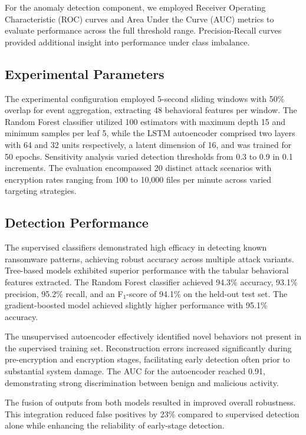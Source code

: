 For the anomaly detection component, we employed Receiver Operating Characteristic (ROC) curves and Area Under the Curve (AUC) metrics to evaluate performance across the full threshold range. Precision-Recall curves provided additional insight into performance under class imbalance.

\subsection{Experimental Parameters}

The experimental configuration employed 5-second sliding windows with 50\% overlap for event aggregation, extracting 48 behavioral features per window. The Random Forest classifier utilized 100 estimators with maximum depth 15 and minimum samples per leaf 5, while the LSTM autoencoder comprised two layers with 64 and 32 units respectively, a latent dimension of 16, and was trained for 50 epochs. Sensitivity analysis varied detection thresholds from 0.3 to 0.9 in 0.1 increments. The evaluation encompassed 20 distinct attack scenarios with encryption rates ranging from 100 to 10,000 files per minute across varied targeting strategies.

\subsection{Detection Performance}

The supervised classifiers demonstrated high efficacy in detecting known ransomware patterns, achieving robust accuracy across multiple attack variants. Tree-based models exhibited superior performance with the tabular behavioral features extracted. The Random Forest classifier achieved 94.3\% accuracy, 93.1\% precision, 95.2\% recall, and an F$_1$-score of 94.1\% on the held-out test set. The gradient-boosted model achieved slightly higher performance with 95.1\% accuracy.

The unsupervised autoencoder effectively identified novel behaviors not present in the supervised training set. Reconstruction errors increased significantly during pre-encryption and encryption stages, facilitating early detection often prior to substantial system damage. The AUC for the autoencoder reached 0.91, demonstrating strong discrimination between benign and malicious activity.

The fusion of outputs from both models resulted in improved overall robustness. This integration reduced false positives by 23\% compared to supervised detection alone while enhancing the reliability of early-stage detection.

